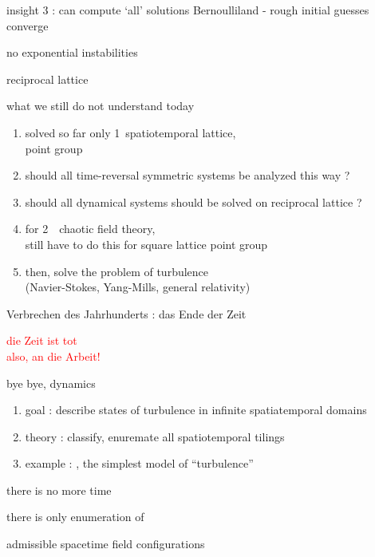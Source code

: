 \begin{frame}{insight 3 : can compute `all' solutions}
Bernoulliland - rough initial guesses converge

\bigskip

no exponential instabilities

\bigskip

reciprocal lattice
\end{frame} %

\begin{frame} {what we still do not understand today}
  \begin{enumerate}
              \item
solved so far only 1\dmn\ {\color{orange}spatio}{temporal} lattice,
\\
point group 
              \item
should all time-reversal symmetric systems be analyzed this way ?
              \item
should all dynamical systems should be solved on reciprocal lattice ?
              \item
for 2\dmn\ \spt\ chaotic field theory,
\\
still have to do this for square lattice point group 
              \item
then, solve the problem of turbulence \\
(Navier-Stokes, Yang-Mills, general relativity)
   \end{enumerate}
\end{frame} %

\begin{frame}{Verbrechen des Jahrhunderts : das Ende der Zeit}
\begin{center}
\textcolor{red}{{\huge die Zeit ist tot}
    \\
{also, an die Arbeit!}}
\end{center}
\end{frame} %

\begin{frame}{bye bye, dynamics}
\begin{enumerate}
              \item
goal : describe states of turbulence in infinite spatiatemporal domains
              \item
theory : classify, enuremate all spatiotemporal tilings
              \item
example : \catlatt, the simplest model of ``turbulence''
\end{enumerate}

\vfill

there is no more time

\medskip

there is only enumeration of

\hfill
admissible spacetime field configurations
\end{frame} %

